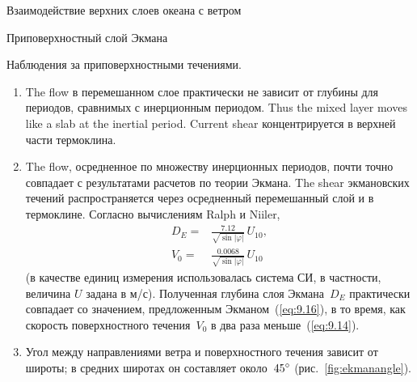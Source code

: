 \begin{chapter}{Взаимодействие верхних слоев океана с ветром}
\begin{section}{Приповерхностный слой Экмана}
\begin{paragraph}{Наблюдения за приповерхностными течениями.}
\begin{enumerate}
\item 
The flow в перемешанном слое практически не зависит от глубины%
 для периодов, сравнимых
с инерционным периодом. 
Thus the mixed layer moves like a slab at the inertial period. 
Current shear концентрируется в верхней части 
термоклина.
%

\item 
The flow, осредненное по множеству инерционных периодов, почти точно совпадает
с результатами расчетов по теории Экмана. The shear экмановских течений
распространяется через осредненный перемешанный 
слой и в термоклине. Согласно 
вычислениям Ralph и Niiler, 
\begin{align}
 D_E =& \frac{7.12}{\sqrt{\sin|\varphi|}}\, U_{10},  \label{eq:9.20}\\
 V_0 =& \frac{0.0068}{\sqrt{\sin|\varphi|}}\, U_{10} \label{eq:9.21}
\end{align}
(в качестве единиц измерения использовалась система СИ, в частности,
величина $U$ задана в м/с). Полученная глубина слоя Экмана~$D_E$ 
практически совпадает со значением, предложенным Экманом~(\ref{eq:9.16}), 
в то время, как скорость поверхностного течения~$V_0$ в два раза 
меньше~(\ref{eq:9.14}).
%

\item 
Угол между направлениями ветра и поверхностного течения зависит от широты;
в средних широтах он составляет около~${45}^\circ$ 
(рис.~\ref{fig:ekmanangle}).
%


\end{enumerate}
\end{paragraph}
\end{section}
\end{chapter}
